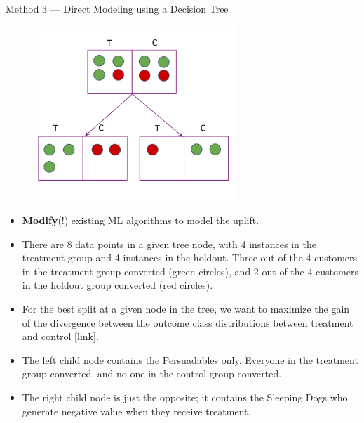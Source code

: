 \documentclass[20pt]{beamer}
\begin{document}
\begin{frame}{Method 3 --- Direct Modeling using a Decision Tree}
  \begin{figure}[p]
  \centering
  \includegraphics[width=3in]{./images/decision_tree.png}
  \end{figure}

\begin{itemize}
  \item \textbf{Modify}(!) existing ML algorithms to model the uplift.

  \item There are 8 data points in a given tree node, with 4 instances in the treatment group and 4 instances in the holdout. Three out of the 4 customers in the treatment group converted (green circles), and 2 out of the 4 customers in the holdout group converted (red circles).

  \item For the best split at a given node in the tree, we want to maximize the gain of the divergence between the outcome class distributions between treatment and control [\href{https://www.aboutwayfair.com/data-science/2019/10/modeling-uplift-directly-uplift-decision-tree-with-kl-divergence-and-euclidean-distance-as-splitting-criteria/}{link}].

  \item The left child node contains the Persuadables only. Everyone in the treatment group converted, and no one in the control group converted.

  \item The right child node is just the opposite; it contains the Sleeping Dogs who generate negative value when they receive treatment.
\end{itemize}
\end{frame}
\end{document}
